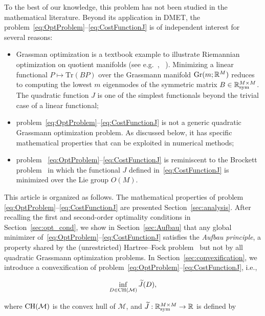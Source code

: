 \documentclass{article}
\def\R{\mathbb R}
\newcommand{\1}{{\mathds 1}}
\begin{document}
\medskip

To the best of our knowledge, this problem has not been studied in the mathematical literature. Beyond its application in DMET, the problem~\eqref{eq:OptProblem}--\eqref{eq:CostFunctionJ} is of independent interest for several reasons:
\begin{itemize}
\item Grassman optimization is a textbook example to illustrate Riemannian optimization on quotient manifolds (see e.g.~\cite[Chapter 3]{absil2008optimization}, ~\cite[Chapter 9]{boumal2023introduction}). Minimizing a linear functional $P \mapsto \text{Tr}(BP)$ over the Grassmann manifold ${\rm Gr}(m;\R^M)$ reduces to computing the lowest $m$ eigenmodes of the symmetric matrix $B \in \R^{M \times M}_{\rm sym}$. The quadratic function $J$ is one of the simplest functionals beyond the trivial case of a linear functional;
    \item problem~\eqref{eq:OptProblem}--\eqref{eq:CostFunctionJ} is not a generic quadratic Grassmann optimization problem. As discussed below, it has specific mathematical properties that can be exploited in numerical methods;
    \item problem ~\eqref{eq:OptProblem}--\eqref{eq:CostFunctionJ} is reminiscent to the Brockett problem~\cite{boumal2023} in which the functional $J$ defined in~\eqref{eq:CostFunctionJ} is minimized over the Lie group $O(M)$.
\end{itemize}

This article is organized as follows. The mathematical properties of problem \eqref{eq:OptProblem}--\eqref{eq:CostFunctionJ} are presented Section~\ref{sec:analysis}. After recalling the first and second-order optimality conditions in Section~\ref{sec:opt_cond}, we show in Section~\ref{sec:Aufbau} that any global minimizer of~\eqref{eq:OptProblem}--\eqref{eq:CostFunctionJ} satisfies the {\em Aufbau principle}, a property shared by the (unrestricted) Hartree--Fock problem~\cite{BLLS94} but not by all quadratic Grassmann optimization problems. In Section~\ref{sec:convexification}, we introduce a convexification of problem~\eqref{eq:OptProblem}--\eqref{eq:CostFunctionJ}, i.e., 

\begin{equation}
\label{eq:convexification}
\inf_{D \in {\rm CH}(\mathcal M)} \widetilde J(D),
\end{equation}

\noindent 
where ${\rm CH}(\mathcal M)$ is the convex hull of $\mathcal M$, and $\widetilde J: \R^{M \times M}_{\rm sym} \to \R$ is defined by 
\end{document}
